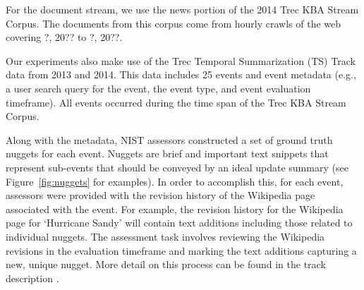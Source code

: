 For the document stream, we use the news portion of the
 2014 Trec KBA Stream Corpus.
The documents from this corpus come from hourly crawls of the web covering 
 ?, 20?? to ?, 20??. 

Our experiments also make use of the Trec Temporal Summarization (TS) Track
 data from 2013 and 2014. 
This data includes 25 events and event metadata (e.g., a user
search query for the event, the event type, and event evaluation timeframe).  
All events occurred during the time span of the Trec KBA Stream Corpus.

Along with the metadata, NIST assessors constructed a set of ground truth nuggets for each event. 
Nuggets are brief and important text snippets that represent sub-events that should be conveyed
by an ideal update summary (see Figure~\ref{fig:nuggets} for examples).
In order
to accomplish this, for each event, assessors were provided with the
revision history of the Wikipedia page associated with the event.  
For example, 
the revision history for the Wikipedia page for `Hurricane Sandy' will 
contain text additions including those related to individual nuggets.  The assessment
task involves reviewing the Wikipedia revisions in the evaluation timeframe 
and marking the text additions capturing a new, unique nugget.  More detail
on this process can be found in the track description \cite{?}.


